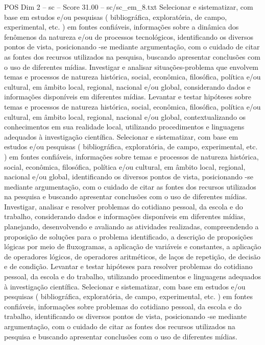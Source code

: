\begin{textsample}{POS Dim 2 – sc – Score 31.00 – sc/sc\_em\_8.txt}
Selecionar e sistematizar, com base em estudos e/ou pesquisas ( bibliográfica, exploratória, de campo, experimental, etc. ) em fontes confiáveis, informações sobre a dinâmica dos fenômenos da natureza e/ou de processos tecnológicos, identificando os diversos pontos de vista, posicionando -se mediante argumentação, com o cuidado de citar as fontes dos recursos utilizados na pesquisa, buscando apresentar conclusões com o uso de diferentes mídias.
Investigar e analisar situações-problema que envolvem temas e processos de natureza histórica, social, econômica, filosófica, política e/ou cultural, em âmbito local, regional, nacional e/ou global, considerando dados e informações disponíveis em diferentes mídias.
Levantar e testar hipóteses sobre temas e processos de natureza histórica, social, econômica, filosófica, política e/ou cultural, em âmbito local, regional, nacional e/ou global, contextualizando os conhecimentos em sua realidade local, utilizando procedimentos e linguagens adequados à investigação científica.
Selecionar e sistematizar, com base em estudos e/ou pesquisas ( bibliográfica, exploratória, de campo, experimental, etc. ) em fontes confiáveis, informações sobre temas e processos de natureza histórica, social, econômica, filosófica, política e/ou cultural, em âmbito local, regional, nacional e/ou global, identificando os diversos pontos de vista, posicionando -se mediante argumentação, com o cuidado de citar as fontes dos recursos utilizados na pesquisa e buscando apresentar conclusões com o uso de diferentes mídias.
Investigar, analisar e resolver problemas do cotidiano pessoal, da escola e do trabalho, considerando dados e informações disponíveis em diferentes mídias, planejando, desenvolvendo e avaliando as atividades realizadas, compreendendo a proposição de soluções para o problema identificado, a descrição de proposições lógicas por meio de fluxogramas, a aplicação de variáveis e constantes, a aplicação de operadores lógicos, de operadores aritméticos, de laços de repetição, de decisão e de condição.
Levantar e testar hipóteses para resolver problemas do cotidiano pessoal, da escola e do trabalho, utilizando procedimentos e linguagens adequados à investigação científica.
Selecionar e sistematizar, com base em estudos e/ou pesquisas ( bibliográfica, exploratória, de campo, experimental, etc. ) em fontes confiáveis, informações sobre problemas do cotidiano pessoal, da escola e do trabalho, identificando os diversos pontos de vista, posicionando -se mediante argumentação, com o cuidado de citar as fontes dos recursos utilizados na pesquisa e buscando apresentar conclusões com o uso de diferentes mídias.

\end{textsample}
